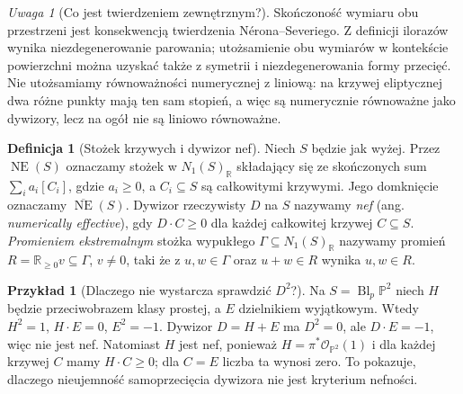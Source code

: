 \documentclass[11pt,a4paper,openany]{report}
\numberwithin{equation}{section}
\theoremstyle{plain}
\theoremstyle{definition}
\newtheorem{definicja}[twierdzenie]{Definicja}
\newtheorem{przyklad}[twierdzenie]{Przykład}
\theoremstyle{remark}
\newtheorem{uwaga}[twierdzenie]{Uwaga}
\newcommand{\R}{\mathbb R}
\newcommand{\PP}{\mathbb P}
\begin{document}
\begin{uwaga}[Co jest twierdzeniem zewnętrznym?]
Skończoność wymiaru obu przestrzeni jest konsekwencją
twierdzenia Nérona--Severiego. Z definicji ilorazów
wynika niezdegenerowanie parowania; utożsamienie obu
wymiarów w kontekście powierzchni można uzyskać także
z symetrii i niezdegenerowania formy przecięć.
Nie utożsamiamy równoważności numerycznej z liniową:
na krzywej eliptycznej dwa różne punkty mają ten sam
stopień, a więc są numerycznie równoważne jako dywizory,
lecz na ogół nie są liniowo równoważne.
\end{uwaga}

\begin{definicja}[Stożek krzywych i dywizor nef]
\label{def:ga8-nef}
Niech $S$ będzie jak wyżej. Przez $\operatorname{NE}(S)$
oznaczamy stożek w $N_1(S)_{\R}$ składający się ze
skończonych sum $\sum_i a_i[C_i]$, gdzie $a_i\ge0$,
a $C_i\subseteq S$ są całkowitymi krzywymi.
Jego domknięcie oznaczamy $\overline{\operatorname{NE}}(S)$.
Dywizor rzeczywisty $D$ na $S$ nazywamy \emph{nef}
(ang. \emph{numerically effective}), gdy $D\cdot C\ge0$
dla każdej całkowitej krzywej $C\subseteq S$.
\emph{Promieniem ekstremalnym} stożka wypukłego
$\Gamma\subseteq N_1(S)_{\R}$ nazywamy promień
$R=\R_{\ge0}v\subseteq\Gamma$, $v\ne0$, taki że
z $u,w\in\Gamma$ oraz $u+w\in R$ wynika $u,w\in R$.
\end{definicja}

\begin{przyklad}[Dlaczego nie wystarcza sprawdzić $D^2$?]
Na $S=\operatorname{Bl}_p\PP^2$ niech $H$ będzie
przeciwobrazem klasy prostej, a $E$ dzielnikiem wyjątkowym.
Wtedy $H^2=1$, $H\cdot E=0$, $E^2=-1$.
Dywizor $D=H+E$ ma $D^2=0$, ale $D\cdot E=-1$,
więc nie jest nef. Natomiast $H$ jest nef, ponieważ
$H=\pi^*\mathcal O_{\PP^2}(1)$ i dla każdej krzywej
$C$ mamy $H\cdot C\ge0$; dla $C=E$ liczba ta wynosi zero.
To pokazuje, dlaczego nieujemność samoprzecięcia
dywizora nie jest kryterium nefności.
\end{przyklad}
\end{document}
